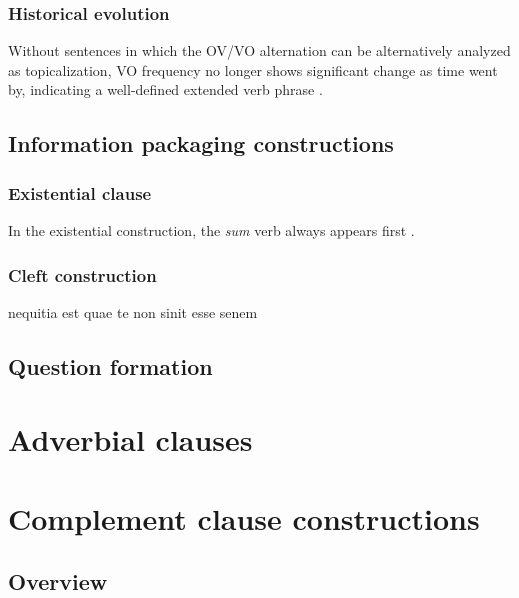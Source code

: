 \documentclass[a4paper, oneside, 12pt]{report}
\newcommand*{\citesec}[1]{\S~{#1}}
\newcommand*{\citepage}[1]{p.~{#1}}
\newcommand{\form}[1]{\emph{#1}}
\begin{document}
\subsection{Historical evolution}\label{sec:constituent-order.history}

Without sentences in which the OV/VO alternation 
can be alternatively analyzed as topicalization,
VO frequency no longer shows significant change as time went by,
indicating a well-defined extended verb phrase \citep[\citesec{1.5}, \citepage{29}]{danckaert2017development}.

\section{Information packaging constructions}

\subsection{Existential clause}\label{sec:clause.exist}

In the existential construction,
the \form{sum} verb always appears first
\citep[\citepage{396}]{allen1903allen}.

\subsection{Cleft construction}

nequitia est quae te non sinit esse senem

\section{Question formation}



\chapter{Adverbial clauses}



\chapter{Complement clause constructions}\label{chap:complement-clause-construct}

\section{Overview}\label{sec:complement-clause-construct-overview}
\end{document}
